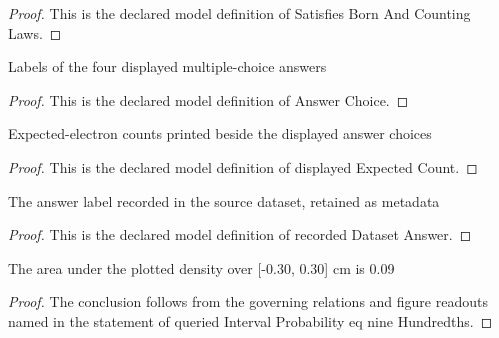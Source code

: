 \begin{proof}
  This is the declared model definition of Satisfies Born And Counting Laws.
\end{proof}
\begin{definition}
  \label{def:physics:phyx-mini-0505:phyxminiproblems-problemphyxmini0505-answerchoice}
  Labels of the four displayed multiple-choice answers
\end{definition}
\begin{proof}
  This is the declared model definition of Answer Choice.
\end{proof}
\begin{definition}
  \label{def:physics:phyx-mini-0505:phyxminiproblems-problemphyxmini0505-displayedexpectedcount}
  Expected-electron counts printed beside the displayed answer choices
\end{definition}
\begin{proof}
  This is the declared model definition of displayed Expected Count.
\end{proof}
\begin{definition}
  \label{def:physics:phyx-mini-0505:phyxminiproblems-problemphyxmini0505-recordeddatasetanswer}
  The answer label recorded in the source dataset, retained as metadata
\end{definition}
\begin{proof}
  This is the declared model definition of recorded Dataset Answer.
\end{proof}
\begin{lemma}
  \label{lem:physics:phyx-mini-0505:phyxminiproblems-problemphyxmini0505-queriedintervalprobability-eq-ninehundredths}
  The area under the plotted density over [-0.30, 0.30] cm is 0.09
\end{lemma}
\begin{proof}
  The conclusion follows from the governing relations and figure readouts named in the statement of queried Interval Probability eq nine Hundredths.
\end{proof}
